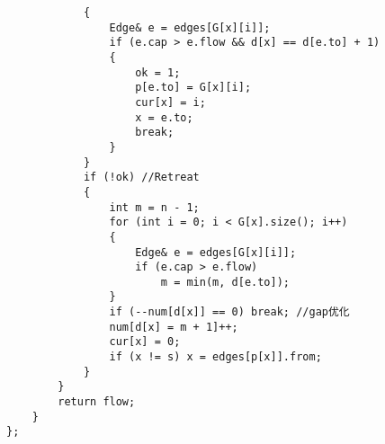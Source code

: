\documentclass[twoside]{article}
\begin{document}
\begin{lstlisting}
            {
                Edge& e = edges[G[x][i]];
                if (e.cap > e.flow && d[x] == d[e.to] + 1)
                {
                    ok = 1;
                    p[e.to] = G[x][i];
                    cur[x] = i;
                    x = e.to;
                    break;
                }
            }
            if (!ok) //Retreat
            {
                int m = n - 1;
                for (int i = 0; i < G[x].size(); i++)
                {
                    Edge& e = edges[G[x][i]];
                    if (e.cap > e.flow)
                        m = min(m, d[e.to]);
                }
                if (--num[d[x]] == 0) break; //gap优化
                num[d[x] = m + 1]++;
                cur[x] = 0;
                if (x != s) x = edges[p[x]].from;
            }
        }
        return flow;
    }
};
\end{lstlisting}
\end{document}
